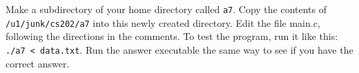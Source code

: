 \documentclass[12pt]{article}
\begin{document}
\noindent
Make a subdirectory of your home directory called \texttt{a7}. Copy the
contents of \texttt{/u1/junk/cs202/a7} into this newly created directory. Edit
the file main.c, following the directions in the comments. To test the program,
run it like this: \texttt{./a7 < data.txt}. Run the answer executable the same
way to see if you have the correct answer.
\end{document}
